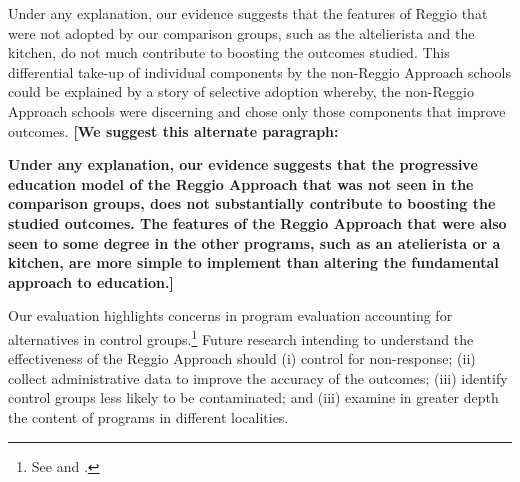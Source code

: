 Under any explanation, our evidence suggests that the features of Reggio that were not adopted by our comparison groups, such as the altelierista and the kitchen, do not much contribute to boosting the outcomes studied. This differential take-up of individual components by the non-Reggio Approach schools could be explained by a story of selective adoption whereby, the non-Reggio Approach schools were discerning and chose only those components that improve outcomes.
\textbf{[We suggest this alternate paragraph:} 

\textbf{Under any explanation, our evidence suggests that the progressive education model of the Reggio Approach that was not seen in the comparison groups, does not substantially contribute to boosting the studied outcomes. The features of the Reggio Approach that were also seen to some degree in the other programs, such as an atelierista or a kitchen, are more simple to implement than altering the fundamental approach to education.]}

Our evaluation highlights concerns in program evaluation accounting for alternatives in control groups.\footnote{See \cite{Heckman_Hohmann_etal_2000_QJE} and \cite{Kline_Walters_2016_QJE}.} Future research intending to understand the effectiveness of the Reggio Approach should (i) control for non-response; (ii) collect administrative data to improve the accuracy of the outcomes; (iii) identify control groups less likely to be contaminated; and (iii) examine in greater depth the content of programs in different localities.




